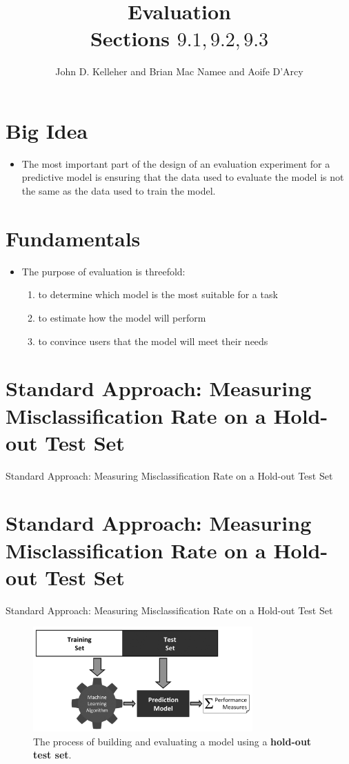 \documentclass[xcolor={table}]{beamer}
\title{Evaluation\\Sections $9.1, 9.2, 9.3$}
\author{John D. Kelleher and Brian Mac Namee and Aoife D'Arcy}
\institute{}
\date{}
\newcommand{\SectionSlide}[2][]{
	\ifthenelse{\isempty{#1}}
		{\section{#2}\begin{frame} \begin{center}\begin{huge}#2\end{huge}\end{center}\end{frame}}
		{\section[#1]{#2}\begin{frame} \begin{center}\begin{huge}#2\end{huge}\end{center}\end{frame}}
}
\newcommand{\indexkeyword}[1]{\alert{\textbf{#1}\index{#1}}}
\begin{document}
\begin{frame}
	\titlepage
\end{frame}
\begin{frame}
	 \tableofcontents
\end{frame}


\section{Big Idea}

\begin{frame}
	\begin{itemize}
		\item The most important part of the design of an evaluation experiment for a predictive model is ensuring that the data used to evaluate the model is not the same as the data used to train the model.
	\end{itemize}
\end{frame}

\section{Fundamentals}

\begin{frame}
\begin{itemize}
	\item The purpose of evaluation is threefold:
	\begin{enumerate}
		\item to determine which model is the most suitable for a task
		\item to estimate how the model will perform
		\item to convince users that the model will meet their needs
	\end{enumerate}
\end{itemize}
\end{frame}

\SectionSlide{Standard Approach: Measuring Misclassification Rate on a Hold-out Test Set}



 \begin{frame} 
\begin{figure}[htb]
       \begin{centering}
			\includegraphics[width=0.75\textwidth]{images/EvaluationProcessesHoldOut2_BW.pdf}
       \caption{The process of building and evaluating a model using a \indexkeyword{hold-out test set}.}
       \label{fig:holdoutTestSetProcess}
       \end{centering}
\end{figure}
\end{frame} 
\end{document}

